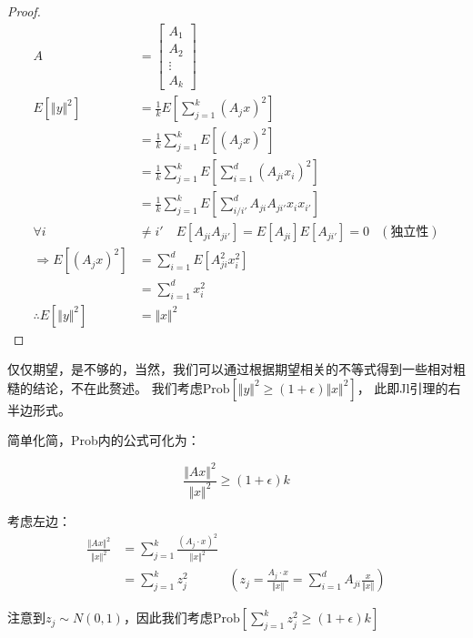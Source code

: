 \documentclass[lang=cn,newtx,10pt,scheme=chinese,chinesefont=nofont,citestyle=gb7714-2015, bibstyle=gb7714-2015]{elegantbook}
\begin{document}
\begin{refsection}
\begin{proof}
	\begin{equation*}
		\begin{aligned}
			A &= \begin{bmatrix}
				A_1 \\
				A_2 \\
				\vdots \\
				A_k 
			\end{bmatrix}\\
			E[\Vert y \Vert^2] &= \frac 1 k E[\sum_{j=1}^k  (A_jx)^2] \\
			&= \frac{1}{k} \sum_{j=1}^{k} E[(A_jx)^2] \\
			&= \frac{1}{k} \sum_{j=1}^{k} E[\sum_{i=1}^{d}(A_{ji}x_i)^2] \\
			&= \frac{1}{k} \sum_{j=1}^{k} E[\sum_{i/i'}^d A_{ji}A_{ji'}x_ix_{i'}] \\
			\forall i &\neq i' \quad E[A_{ji}A_{ji'}] = E[A_{ji}]E[A_{ji'}] = 0 &(\text{独立性})\\
			\Rightarrow E[(A_jx)^2] &= \sum_{i=1}^{d} E[A_{ji}^2x_i^2] \\
			&= \sum_{i=1}^{d} x_i^2 \\
			\therefore E[\Vert y \Vert^2] &= \Vert x \Vert^2
		\end{aligned}
	\end{equation*}

\end{proof}

仅仅期望，是不够的，当然，我们可以通过根据期望相关的不等式得到一些相对粗糙的结论，不在此赘述。
我们考虑$\mathrm{Prob}\left[\Vert y\Vert^2\ge(1+\epsilon)\Vert x \Vert^2 \right]$，
此即Jl引理的右半边形式。

简单化简，Prob内的公式可化为：

$$
\frac{\Vert Ax\Vert^2}{\Vert x\Vert^2}\ge (1+\epsilon)k
$$

考虑左边：
\begin{align*}
	\frac{\Vert Ax\Vert^2}{\Vert x\Vert^2} &= \sum_{j=1}^{k}\frac{(A_j\cdot x)^2}{\Vert x \Vert^2}\\
	&=\sum_{j=1}^{k} z_j^2&(z_j=\frac{A_j\cdot x}{\Vert x \Vert}=\sum_{i=1}^{d}A_{ji}\frac{x}{\Vert x \Vert})
\end{align*}

注意到$z_j \sim N(0,1)$，因此我们考虑$\mathrm{Prob}\left[\sum_{j=1}^{k}z_j^2 \ge (1+\epsilon)k \right]$


\end{refsection}
\end{document}
